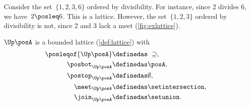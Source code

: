 \begin{example}
    Consider the set~$\{1,2,3,6\}$ ordered by divisibility.
    For instance, since 2 divides 6, we have~$2\posleq 6$.
    This is a lattice.
    However, the set~$\{1,2,3\}$ ordered by divisibility is not, since 2 and 3 lack a meet (\cref{fig:exlattice}).
\end{example}

\begin{lemma}
    \label{lem:u_bounded_lat}
    $\Up \posA$ is a bounded lattice (\cref{def:lattice}) with
    \begin{equation}
        \begin{aligned}
            \posleqof{\Up \posA} & \definedas \ \supseteq,      \\
            \posbot_{\Up \posA}  & \definedas \posA,            \\
            \postop_{\Up \posA}  & \definedas \emptyset,        \\
            \meet_{\Up \posA}    & \definedas \setintersection, \\
            \join_{\Up \posA}    & \definedas \setunion.
        \end{aligned}
    \end{equation}
\end{lemma}
